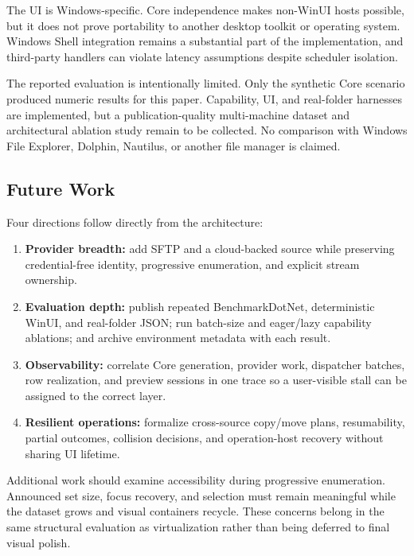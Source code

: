 \documentclass[10pt,a4paper,twoside]{article}
\begin{document}
The UI is Windows-specific. Core independence makes non-WinUI hosts possible, but it does not prove portability
to another desktop toolkit or operating system. Windows Shell integration remains a substantial part of the
implementation, and third-party handlers can violate latency assumptions despite scheduler isolation.

The reported evaluation is intentionally limited. Only the synthetic Core scenario produced numeric results for
this paper. Capability, UI, and real-folder harnesses are implemented, but a publication-quality multi-machine
dataset and architectural ablation study remain to be collected. No comparison with Windows File Explorer,
Dolphin, Nautilus, or another file manager is claimed.

\subsection{Future Work}

Four directions follow directly from the architecture:

\begin{enumerate}[leftmargin=*]
  \item \textbf{Provider breadth:} add SFTP and a cloud-backed source while preserving credential-free identity,
        progressive enumeration, and explicit stream ownership.
  \item \textbf{Evaluation depth:} publish repeated BenchmarkDotNet, deterministic WinUI, and real-folder JSON;
        run batch-size and eager/lazy capability ablations; and archive environment metadata with each result.
  \item \textbf{Observability:} correlate Core generation, provider work, dispatcher batches, row realization, and
        preview sessions in one trace so a user-visible stall can be assigned to the correct layer.
  \item \textbf{Resilient operations:} formalize cross-source copy/move plans, resumability, partial outcomes,
        collision decisions, and operation-host recovery without sharing UI lifetime.
\end{enumerate}

Additional work should examine accessibility during progressive enumeration. Announced set size, focus recovery,
and selection must remain meaningful while the dataset grows and visual containers recycle. These concerns belong
in the same structural evaluation as virtualization rather than being deferred to final visual polish.
\end{document}
